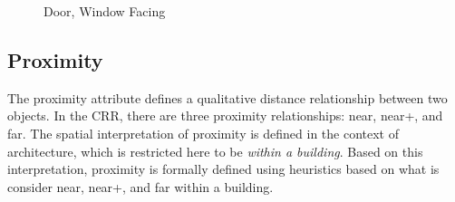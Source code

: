 \documentclass[12pt]{ucthesis}
\begin{document}
\begin{figure}[h]
 \centering
  \hspace{10 mm}
 \caption{Door, Window Facing}
\label{door-window-facing}
\end{figure}



\subsection{Proximity}
The proximity attribute defines a qualitative distance relationship between two objects. In the CRR, there are three proximity relationships: near, near+, and far. The spatial interpretation of proximity is defined in the context of architecture, which is restricted here to be \emph{within a building}. Based on this interpretation, proximity is formally defined using heuristics based on what is consider near, near+, and far within a building.   
\end{document}

